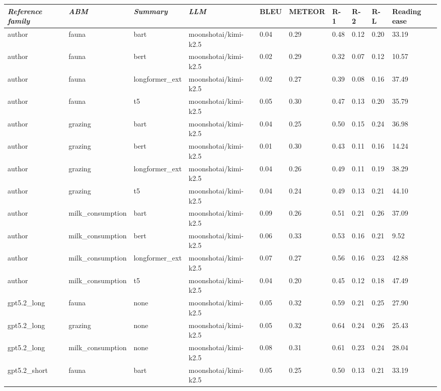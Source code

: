 \begin{tabular}{|l|l|l|l|l|l|l|l|l|l|}
\hline
\textit{\textbf{Reference family}} & \textit{\textbf{ABM}} & \textit{\textbf{Summary}} & \textit{\textbf{LLM}} & BLEU & METEOR & R-1 & R-2 & R-L & Reading ease \\
 \hline
 author & fauna & bart & moonshotai/kimi-k2.5 & 0.04 & 0.29 & 0.48 & 0.12 & 0.20 & 33.19 \\
 \hline
 author & fauna & bert & moonshotai/kimi-k2.5 & 0.02 & 0.29 & 0.32 & 0.07 & 0.12 & 10.57 \\
 \hline
 author & fauna & longformer\_ext & moonshotai/kimi-k2.5 & 0.02 & 0.27 & 0.39 & 0.08 & 0.16 & 37.49 \\
 \hline
 author & fauna & t5 & moonshotai/kimi-k2.5 & 0.05 & 0.30 & 0.47 & 0.13 & 0.20 & 35.79 \\
 \hline
 author & grazing & bart & moonshotai/kimi-k2.5 & 0.04 & 0.25 & 0.50 & 0.15 & 0.24 & 36.98 \\
 \hline
 author & grazing & bert & moonshotai/kimi-k2.5 & 0.01 & 0.30 & 0.43 & 0.11 & 0.16 & 14.24 \\
 \hline
 author & grazing & longformer\_ext & moonshotai/kimi-k2.5 & 0.04 & 0.26 & 0.49 & 0.11 & 0.19 & 38.29 \\
 \hline
 author & grazing & t5 & moonshotai/kimi-k2.5 & 0.04 & 0.24 & 0.49 & 0.13 & 0.21 & 44.10 \\
 \hline
 author & milk\_consumption & bart & moonshotai/kimi-k2.5 & 0.09 & 0.26 & 0.51 & 0.21 & 0.26 & 37.09 \\
 \hline
 author & milk\_consumption & bert & moonshotai/kimi-k2.5 & 0.06 & 0.33 & 0.53 & 0.16 & 0.21 & 9.52 \\
 \hline
 author & milk\_consumption & longformer\_ext & moonshotai/kimi-k2.5 & 0.07 & 0.27 & 0.56 & 0.16 & 0.23 & 42.88 \\
 \hline
 author & milk\_consumption & t5 & moonshotai/kimi-k2.5 & 0.04 & 0.20 & 0.45 & 0.12 & 0.18 & 47.49 \\
 \hline
 gpt5.2\_long & fauna & none & moonshotai/kimi-k2.5 & 0.05 & 0.32 & 0.59 & 0.21 & 0.25 & 27.90 \\
 \hline
 gpt5.2\_long & grazing & none & moonshotai/kimi-k2.5 & 0.05 & 0.32 & 0.64 & 0.24 & 0.26 & 25.43 \\
 \hline
 gpt5.2\_long & milk\_consumption & none & moonshotai/kimi-k2.5 & 0.08 & 0.31 & 0.61 & 0.23 & 0.24 & 28.04 \\
 \hline
 gpt5.2\_short & fauna & bart & moonshotai/kimi-k2.5 & 0.05 & 0.25 & 0.50 & 0.13 & 0.21 & 33.19 \\

\end{tabular}
